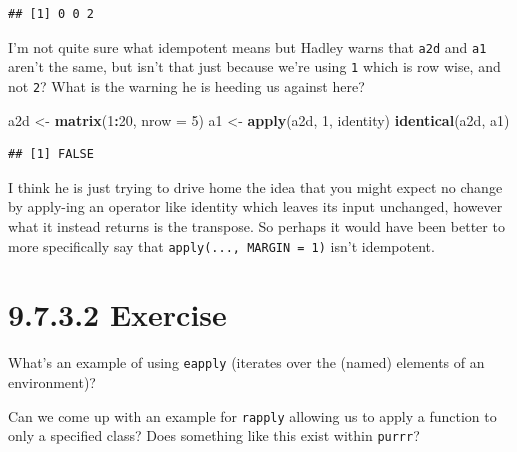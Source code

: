 \documentclass[]{book}
\newenvironment{Shaded}{\begin{snugshade}}{\end{snugshade}}
\newcommand{\DataTypeTok}[1]{\textcolor[rgb]{0.13,0.29,0.53}{#1}}
\newcommand{\DecValTok}[1]{\textcolor[rgb]{0.00,0.00,0.81}{#1}}
\newcommand{\KeywordTok}[1]{\textcolor[rgb]{0.13,0.29,0.53}{\textbf{#1}}}
\newcommand{\NormalTok}[1]{#1}
\newcommand{\OperatorTok}[1]{\textcolor[rgb]{0.81,0.36,0.00}{\textbf{#1}}}
\newcommand{\StringTok}[1]{\textcolor[rgb]{0.31,0.60,0.02}{#1}}
\begin{document}
\begin{verbatim}
## [1] 0 0 2
\end{verbatim}

I'm not quite sure what idempotent means but Hadley warns that \texttt{a2d} and \texttt{a1} aren't the same, but isn't that just because we're using \texttt{1} which is row wise, and not \texttt{2}? What is the warning he is heeding us against here?

\begin{Shaded}
\begin{Highlighting}[]
\NormalTok{a2d <-}\StringTok{ }\KeywordTok{matrix}\NormalTok{(}\DecValTok{1}\OperatorTok{:}\DecValTok{20}\NormalTok{, }\DataTypeTok{nrow =} \DecValTok{5}\NormalTok{)}
\NormalTok{a1 <-}\StringTok{ }\KeywordTok{apply}\NormalTok{(a2d, }\DecValTok{1}\NormalTok{, identity)}
\KeywordTok{identical}\NormalTok{(a2d, a1)}
\end{Highlighting}
\end{Shaded}

\begin{verbatim}
## [1] FALSE
\end{verbatim}

I think he is just trying to drive home the idea that you might expect no change by apply-ing an operator like identity which leaves its input unchanged, however what it instead returns is the transpose. So perhaps it would have been better to more specifically say that \texttt{apply(...,\ MARGIN\ =\ 1)} isn't idempotent.

\hypertarget{exercise-12}{%
\section*{9.7.3.2 Exercise}\label{exercise-12}}

What's an example of using \texttt{eapply} (iterates over the (named) elements of an environment)?

\begin{Shaded}
\end{Shaded}

Can we come up with an example for \texttt{rapply} allowing us to apply a function to only a specified class? Does something like this exist within \texttt{purrr}?
\end{document}
